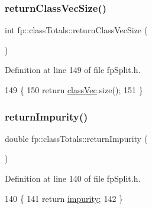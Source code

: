 \subsubsection{\texorpdfstring{return\+Class\+Vec\+Size()}{returnClassVecSize()}}
{\footnotesize\ttfamily int fp\+::class\+Totals\+::return\+Class\+Vec\+Size (\begin{DoxyParamCaption}{ }\end{DoxyParamCaption})\hspace{0.3cm}{\ttfamily [inline]}}



Definition at line 149 of file fp\+Split.\+h.


\begin{DoxyCode}
149                                            \{
150                 \textcolor{keywordflow}{return} \hyperlink{classfp_1_1classTotals_af96102537592dbda8601d0235dfccfca}{classVec}.size();
151             \}
\end{DoxyCode}
\mbox{\label{classfp_1_1classTotals_a82993575e2ad13f057f01050a52ef4ce}} 
\subsubsection{\texorpdfstring{return\+Impurity()}{returnImpurity()}}
{\footnotesize\ttfamily double fp\+::class\+Totals\+::return\+Impurity (\begin{DoxyParamCaption}{ }\end{DoxyParamCaption})\hspace{0.3cm}{\ttfamily [inline]}}



Definition at line 140 of file fp\+Split.\+h.


\begin{DoxyCode}
140                                    \{
141                 \textcolor{keywordflow}{return} \hyperlink{classfp_1_1classTotals_acd239321a9b15e93e6de272c70b301b3}{impurity};
142             \}
\end{DoxyCode}
\mbox{\label{classfp_1_1classTotals_ace51088c43d444d4bcdbe423909c5b91}} 
